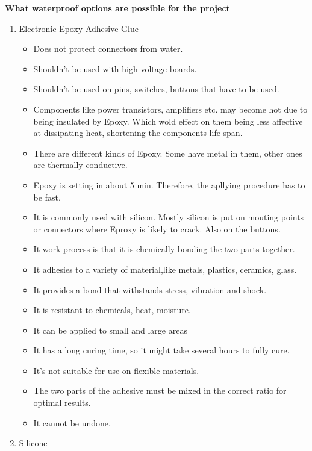 \textbf{What waterproof options are possible for the project}
\begin{enumerate}
    \item Electronic Epoxy Adhesive Glue
          \begin{itemize}
             
              \item Does not protect connectors from water.
              \item Shouldn't be used with high voltage boards.
              \item Shouldn't be used on pins, switches, buttons that have to be used.
              \item Components like power transistors, amplifiers etc. may become hot due to being insulated by Epoxy. Which wold effect on them being less affective at dissipating heat, shortening the components life span.
              \item There are different kinds of Epoxy. Some have metal in them, other ones are thermally conductive.
              \item Epoxy is setting in about 5 min. Therefore, the apllying procedure has to be fast.
              \item It is commonly used with silicon. Mostly silicon is put on mouting points or connectors where Eproxy is likely to crack. Also on the buttons.
              \item It work process is that it is chemically bonding the two parts together.
              \item It adhesies to a variety of material,like metals, plastics, ceramics, glass.
              \item It provides a bond that withstands stress, vibration and shock.
              \item It is resistant to chemicals, heat, moisture.
              \item It can be applied to small and large areas
              \item It has a long curing time, so it might take several hours to fully cure.
              \item It's not suitable for use on flexible materials.
              \item The two parts of the adhesive must be mixed in the correct ratio for optimal results.
              \item It cannot be undone.
          \end{itemize}
    \item Silicone

\end{enumerate}
